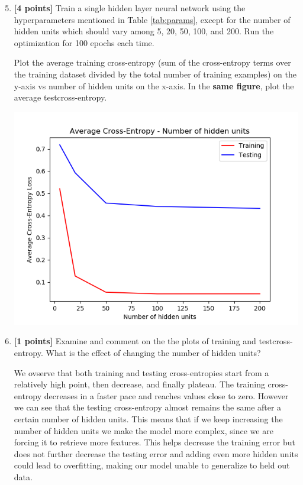 \documentclass[11pt]{article}
\numberwithin{equation}{section} %
\numberwithin{figure}{section} %
\numberwithin{table}{section} %
\newcommand{\ntset}{test}
\newcommand{\points}[1]{{\bf [#1 points]}}
\begin{document}
\begin{enumerate}
\setcounter{enumi}{4}
\item \points{4}  %
Train a single hidden layer neural network using the hyperparameters mentioned in Table \ref{tab:params}, except for the number of hidden units which should vary among 5, 20, 50, 100, and 200.  Run the optimization for 100 epochs each time.

Plot the average training cross-entropy (sum of the cross-entropy terms over the training dataset divided by the total number of training examples) on the y-axis vs number of hidden units on the x-axis. In the \textbf{same figure}, plot the average \ntset \thinspace cross-entropy.

 \begin{tcolorbox}[fit,height=10cm, width=15cm, blank, borderline={1pt}{-2pt}]
    \includegraphics[scale=0.75]{img/plot1.png}
 \end{tcolorbox}



\clearpage
\item \points{1}
Examine and comment on the the plots of training and \ntset\thinspace cross-entropy. What is the effect of changing the number of hidden units?

 \begin{tcolorbox}[fit,height=8cm, width=15cm, blank, borderline={1pt}{-2pt}]
    We ovserve that both training and testing cross-entropies start from a relatively high point, then decrease, and finally plateau. The training cross-entropy decreases in a faster pace and reaches values close to zero. However we can see that the testing cross-entropy almost remains the same after a certain number of hidden units. This means that if we keep increasing the number of hidden units we make the model more complex, since we are forcing it to retrieve more features. This helps decrease the training error but does not further decrease the testing error and adding even more hidden units could lead to overfitting, making our model unable to generalize to held out data.
    \end{tcolorbox}



\end{enumerate}
\end{document}
